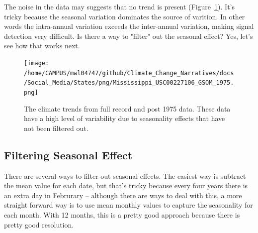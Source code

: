 \documentclass{article}
\begin{document}
\begin{knitrout}
\begin{kframe}
{\ttfamily\noindent\bfseries{}}

{\ttfamily\noindent\bfseries{}}

{\ttfamily\noindent\bfseries{}}

{\ttfamily\noindent\bfseries\color{errorcolor}{\#\# Error in eval(expr, envir, enclos): object 'GSOM' not found}}

{\ttfamily\noindent\bfseries\color{errorcolor}{\#\# Error in text(pred\_dates\$Date[location\_index], ci[location\_index, 3], : object 'pred\_dates' not found}}\end{kframe}
\end{knitrout}

The noise in the data may suggests that no trend is present (Figure~\ref{fig:GSOM-1975trend}). It's tricky because the seasonal variation dominates the source of varition. In other words the intra-annual variation exceeds the inter-annual variation, making signal detection very difficult. Is there a way to "filter" out the seasonal effect? Yes, let's see how that works next. 

\begin{figure}
\texttt{[image: /home/CAMPUS/mwl04747/github/Climate\_Change\_Narratives/docs/Social\_Media/States/png/Mississippi\_USC00227106\_GSOM\_1975.png]}
\caption{The climate trends from full record and post 1975 data. These data have a high level of variability due to seasonality effects that have not been filtered out.}
\label{fig:GSOM-1975trend}
\end{figure}


\subsection{Filtering Seasonal Effect}

There are several ways to filter out seasonal effects. The easiest way is subtract the mean value for each date, but that's tricky because every four years there is an extra day in Februrary -- although there are ways to deal with this, a more straight forward way is to use mean monthly values to capture the seasonality for each month. With 12 months, this is a pretty good approach because there is pretty good resolution. 
\end{document}
